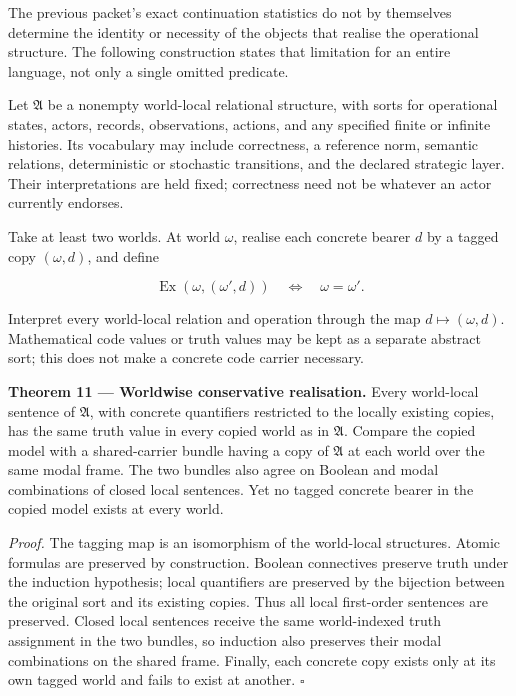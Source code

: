 \documentclass[11pt,a4paper]{article}
\begin{document}
The previous packet's exact continuation statistics do not by themselves
determine the identity or necessity of the objects that realise the
operational structure. The following construction states that limitation
for an entire language, not only a single omitted predicate.

Let \(\mathfrak A\) be a nonempty world-local relational structure, with
sorts for operational states, actors, records, observations, actions,
and any specified finite or infinite histories. Its vocabulary may
include correctness, a reference norm, semantic relations, deterministic
or stochastic transitions, and the declared strategic layer. Their
interpretations are held fixed; correctness need not be whatever an
actor currently endorses.

Take at least two worlds. At world \(\omega\), realise each concrete
bearer \(d\) by a tagged copy \((\omega,d)\), and define

\nopagebreak[4]

\[
\operatorname{Ex}(\omega,(\omega',d))
\quad\Longleftrightarrow\quad \omega=\omega'.
\]

Interpret every world-local relation and operation through the map
\(d\mapsto(\omega,d)\). Mathematical code values or truth values may be
kept as a separate abstract sort; this does not make a concrete code
carrier necessary.


\textbf{Theorem 11 --- Worldwise conservative realisation.} Every
world-local sentence of \(\mathfrak A\), with concrete quantifiers
restricted to the locally existing copies, has the same truth value in
every copied world as in \(\mathfrak A\). Compare the copied model with
a shared-carrier bundle having a copy of \(\mathfrak A\) at each world
over the same modal frame. The two bundles also agree on Boolean and
modal combinations of closed local sentences. Yet no tagged concrete
bearer in the copied model exists at every world.

\emph{Proof.} The tagging map is an isomorphism of the world-local
structures. Atomic formulas are preserved by construction. Boolean
connectives preserve truth under the induction hypothesis; local
quantifiers are preserved by the bijection between the original sort and
its existing copies. Thus all local first-order sentences are preserved.
Closed local sentences receive the same world-indexed truth assignment
in the two bundles, so induction also preserves their modal combinations
on the shared frame. Finally, each concrete copy exists only at its own
tagged world and fails to exist at another. \(\square\)
\end{document}
